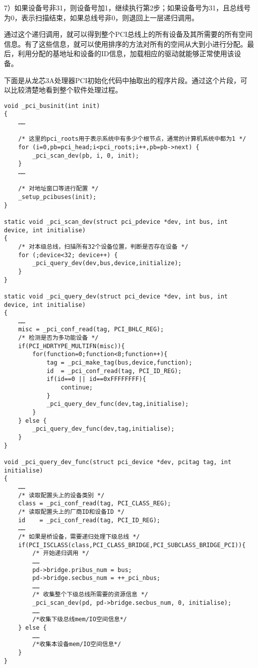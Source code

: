 \documentclass[]{ctexbook}
\begin{document}
7）如果设备号非31，则设备号加1，继续执行第2步；如果设备号为31，且总线号为0，表示扫描结束，如果总线号非0，则退回上一层递归调用。

通过这个递归调用，就可以得到整个PCI总线上的所有设备及其所需要的所有空间信息。有了这些信息，就可以使用排序的方法对所有的空间从大到小进行分配。最后，利用分配的基地址和设备的ID信息，加载相应的驱动就能够正常使用该设备。

下面是从龙芯3A处理器PCI初始化代码中抽取出的程序片段。通过这个片段，可以比较清楚地看到整个软件处理过程。

\begin{verbatim}
void _pci_businit(int init)
{
    ……

    /* 这里的pci_roots用于表示系统中有多少个根节点，通常的计算机系统中都为1 */
    for (i=0,pb=pci_head;i<pci_roots;i++,pb=pb->next) {
        _pci_scan_dev(pb, i, 0, init);
    }
    ……

    /* 对地址窗口等进行配置 */
    _setup_pcibuses(init);
}

static void _pci_scan_dev(struct pci_pdevice *dev, int bus, int device, int initialise)
{
    /* 对本级总线，扫描所有32个设备位置，判断是否存在设备 */
    for (;device<32; device++) {
        _pci_query_dev(dev,bus,device,initialize);
    }
}

static void _pci_query_dev(struct pci_device *dev, int bus, int device, int initialise)
{
    ……
    misc = _pci_conf_read(tag, PCI_BHLC_REG);
    /* 检测是否为多功能设备 */
    if(PCI_HDRTYPE_MULTIFN(misc)){
        for(function=0;function<8;function++){
            tag = _pci_make_tag(bus,device,function);
            id  = _pci_conf_read(tag, PCI_ID_REG);
            if(id==0 || id==0xFFFFFFFF){
                continue;
            }
            _pci_query_dev_func(dev,tag,initialise);
        }
    } else {
        _pci_query_dev_func(dev,tag,initialise);
    }
}

void _pci_query_dev_func(struct pci_device *dev, pcitag tag, int initialise)
{
    ……
    /* 读取配置头上的设备类别 */
    class = _pci_conf_read(tag, PCI_CLASS_REG);
    /* 读取配置头上的厂商ID和设备ID */
    id    = _pci_conf_read(tag, PCI_ID_REG);
    ……
    /* 如果是桥设备，需要递归处理下级总线 */
    if(PCI_ISCLASS(class,PCI_CLASS_BRIDGE,PCI_SUBCLASS_BRIDGE_PCI)){
        /* 开始递归调用 */
        ……
        pd->bridge.pribus_num = bus;
        pd->bridge.secbus_num = ++_pci_nbus;
        ……
        /* 收集整个下级总线所需要的资源信息 */
        _pci_scan_dev(pd, pd->bridge.secbus_num, 0, initialise);
        ……
        /*收集下级总线mem/IO空间信息*/
    } else {
        ……
        /*收集本设备mem/IO空间信息*/
    }
}
\end{verbatim}
\end{document}
